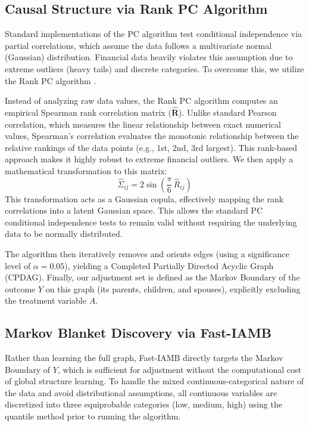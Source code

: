 \documentclass[11pt, a4paper]{article}
\theoremstyle{definition}
\begin{document}
\subsection{Causal Structure via Rank PC Algorithm}

Standard implementations of the PC algorithm test conditional independence via partial
correlations, which assume the data follows a multivariate normal (Gaussian) distribution.
Financial data heavily violates this assumption due to extreme outliers (heavy tails) and
discrete categories. To overcome this, we utilize the Rank PC algorithm \cite{harris2013pc}.

Instead of analyzing raw data values, the Rank PC algorithm computes an empirical
Spearman rank correlation matrix ($\hat{\mathbf{R}}$). Unlike standard Pearson
correlation, which measures the linear relationship between exact numerical values,
Spearman's correlation evaluates the monotonic relationship between the relative rankings
of the data points (e.g., 1st, 2nd, 3rd largest). This rank-based approach makes it
highly robust to extreme financial outliers. We then apply a mathematical transformation
to this matrix:
\begin{equation*}
    \hat{\Sigma}_{ij} = 2 \sin\!\left(\frac{\pi}{6}\, \hat{R}_{ij}\right)
\end{equation*}
This transformation acts as a Gaussian copula, effectively mapping the rank correlations
into a latent Gaussian space. This allows the standard PC conditional independence tests
to remain valid without requiring the underlying data to be normally distributed.

The algorithm then iteratively removes and orients edges (using a significance level of
$\alpha = 0.05$), yielding a Completed Partially Directed Acyclic Graph (CPDAG). Finally,
our adjustment set is defined as the Markov Boundary of the outcome $Y$ on this graph
(its parents, children, and spouses), explicitly excluding the treatment variable $A$.

\subsection{Markov Blanket Discovery via Fast-IAMB}

Rather than learning the full graph, Fast-IAMB \cite{yaramakala2005speculative} directly
targets the Markov Boundary of $Y$, which is sufficient for adjustment without the
computational cost of global structure learning. To handle the mixed continuous-categorical
nature of the data and avoid distributional assumptions, all continuous variables are
discretized into three equiprobable categories (low, medium, high) using the quantile
method prior to running the algorithm.
\end{document}

